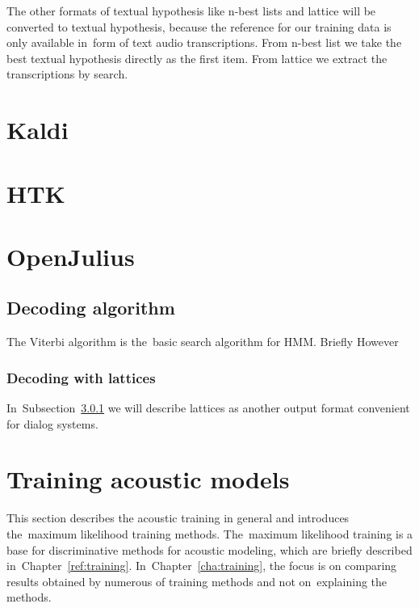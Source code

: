 {The other formats of textual hypothesis like n-best lists and lattice
will be converted to textual hypothesis, because the reference for our training data is only available  
in~form of text audio transcriptions.
From n-best list we take the best textual hypothesis directly as the first item. From lattice
we extract the transcriptions by search.  


\section{Kaldi}
\label{sec:back_kaldi}

\section{\ac{HTK}}
\label{sec:back_htk}

\section{OpenJulius}
\label{sec:back_julius}


\subsection*{Decoding algorithm}
\label{sub:dec_algorithm}
The Viterbi algorithm is the~basic search algorithm for \ac{HMM}. 
Briefly
However


\subsubsection{Decoding with lattices}
\label{sub:lattice}
In~Subsection~\ref{sub:lattice} we will describe lattices as another output format convenient for dialog systems.





\section{Training acoustic models} 
\label{sec:train_ml}

This section describes the acoustic training in general and introduces the~maximum likelihood training methods.
The~maximum likelihood training is a base for discriminative methods for acoustic modeling, which are briefly
described in~Chapter~\ref{ref:training}.
In~Chapter~\ref{cha:training}, the focus is on comparing results obtained by numerous of training methods
and not on~explaining the methods.

}
